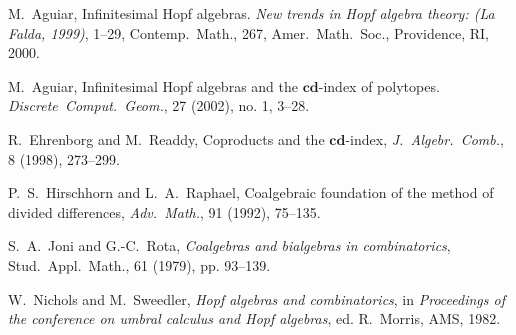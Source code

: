 \documentclass[12pt]{article}
\begin{document}
%
\begin{thebibliography}{99}
M.~Aguiar, Infinitesimal Hopf algebras.  {\it New trends in Hopf algebra theory: (La Falda, 1999)},  1--29, Contemp.~Math., 267, Amer.~Math.~Soc., Providence, RI, 2000. 

M.~Aguiar, Infinitesimal Hopf algebras and the $\mathbf{cd}$-index of polytopes.  {\it Discrete~Comput.~Geom.}, 27 (2002), no. 1, 3--28. 



R.~Ehrenborg and M.~Readdy, Coproducts and the $\mathbf{cd}$-index,  {\it J.~Algebr.~Comb.}, 8 (1998), 273--299.


P.~S.~Hirschhorn and L.~A.~Raphael, Coalgebraic foundation of the method of divided differences,  {\it Adv.~Math.}, 91 (1992), 75--135.

S.~A.~Joni and G.-C.~Rota, {\it Coalgebras and bialgebras in combinatorics}, Stud.~Appl.~Math., 61 (1979), pp. 93--139.

W.~Nichols and M.~Sweedler, {\it Hopf algebras and combinatorics}, in {\it Proceedings of the conference on umbral calculus and Hopf algebras}, ed. R.~Morris, AMS, 1982.

\end{thebibliography}

\end{document}

